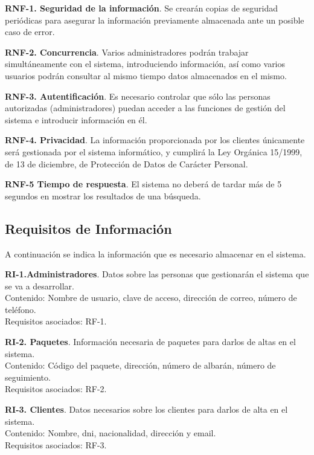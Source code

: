\documentclass[a4paper, 11pt]{article}
\begin{document}
\setlength{\parindent}{20pt}
\textbf{RNF-1. Seguridad de la informaci\'on}. Se crear\'an copias de seguridad peri\'odicas para asegurar la informaci\'on previamente almacenada ante un posible caso de error.

\textbf{RNF-2. Concurrencia}. Varios administradores podr\'an trabajar simult\'aneamente con el sistema, introduciendo informaci\'on, as\'i como varios usuarios podr\'an consultar al mismo tiempo
datos almacenados en el mismo.

\textbf{RNF-3. Autentificaci\'on}. Es necesario controlar que s\'olo las personas autorizadas (administradores) puedan acceder a las funciones de gesti\'on del sistema e introducir informaci\'on en \'el.

\textbf{RNF-4. Privacidad}. La informaci\'on proporcionada por los clientes \'unicamente ser\'a gestionada por el sistema inform\'atico, y cumplir\'a la Ley Org\'anica 15/1999, de 13 de diciembre, de Protecci\'on de Datos de Car\'acter Personal.

\textbf{RNF-5 Tiempo de respuesta}. El sistema no deber\'a de tardar m\'as de 5 segundos en mostrar los resultados de una b\'usqueda.

\subsection{Requisitos de Informaci\'on}
\setlength{\parindent}{12pt}
A continuaci\'on se indica la informaci\'on que es necesario almacenar en el sistema.
\setlength{\parindent}{20pt}

\textbf{RI-1.Administradores}.  Datos sobre las personas que gestionar\'an el sistema que se va a desarrollar.\\
Contenido: Nombre de usuario, clave de acceso, direcci\'on de correo, n\'umero de tel\'efono.\\
Requisitos asociados: RF-1.

\textbf{RI-2. Paquetes}. Informaci\'on necesaria de paquetes para darlos de altas en el sistema.\\
Contenido: C\'odigo del paquete, direcci\'on, n\'umero de albar\'an, n\'umero de seguimiento.\\
Requisitos asociados: RF-2.

\textbf{RI-3. Clientes}. Datos necesarios sobre los clientes para darlos de alta en el sistema.\\
Contenido: Nombre, dni, nacionalidad, direcci\'on y email.\\
Requisitos asociados: RF-3.
\end{document}
